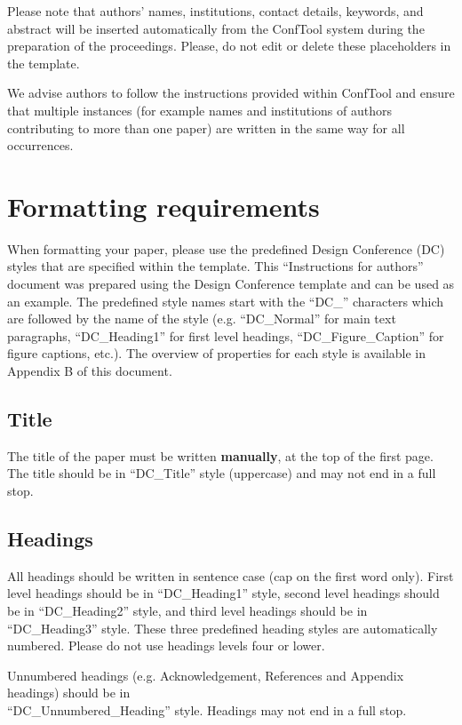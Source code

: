\documentclass{design}
\begin{document}
Please note that authors’ names, institutions, contact details, keywords, and abstract will be inserted automatically from the ConfTool system during the preparation of the proceedings. Please, do not edit or delete these placeholders in the template.

We advise authors to follow the instructions provided within ConfTool and ensure that multiple instances (for example names and institutions of authors contributing to more than one paper) are written in the same way for all occurrences.

\section{Formatting requirements}

When formatting your paper, please use the predefined Design Conference (DC) styles that are specified within the template. This “Instructions for authors” document was prepared using the Design Conference template and can be used as an example. The predefined style names start with the “DC\_” characters which are followed by the name of the style (e.g. “DC\_Normal” for main text paragraphs, “DC\_Heading1” for first level headings, “DC\_Figure\_Caption” for figure captions, etc.). The overview of properties for each style is available in Appendix B of this document.

\subsection{Title}

The title of the paper must be written \textbf{manually}, at the top of the first page. The title should be in “DC\_Title” style (uppercase) and may not end in a full stop.

\subsection{Headings}

All headings should be written in sentence case (cap on the first word only). First level headings should be in “DC\_Heading1” style, second level headings should be in “DC\_Heading2” style, and third level headings should be in “DC\_Heading3” style. These three predefined heading styles are automatically numbered. Please do not use headings levels four or lower.

Unnumbered headings (e.g. Acknowledgement, References and Appendix headings) should be in \\ “DC\_Unnumbered\_Heading” style. Headings may not end in a full stop.
\end{document}
